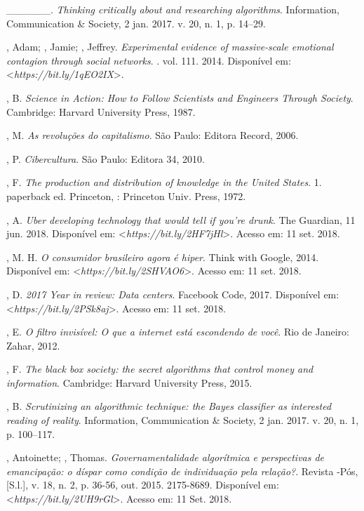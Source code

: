 \begin{Parskip}
\_\_\_\_\_\_. \emph{Thinking critically about and researching
algorithms}. Information, Communication \& Society, 2 jan. 2017. v. 20,
n. 1, p. 14--29.

, Adam; , Jamie; , Jeffrey. \emph{Experimental evidence of massive-scale emotional contagion through social networks}. . vol.
111. 2014. Disponível em: \textless{}\emph{https://bit.ly/1qEO2IX}\textgreater{}.

, B. \emph{Science in Action: How to Follow Scientists and
Engineers Through Society}. Cambridge: Harvard University Press, 1987.

, M. \emph{As revoluções do capitalismo}. São Paulo: Editora
Record, 2006.

, P. \emph{Cibercultura}. São Paulo: Editora 34, 2010.

, F. \emph{The production and distribution of knowledge in the
United States}. 1. paperback ed. Princeton, : Princeton Univ.
Press, 1972.

, A. \emph{Uber developing technology that would tell if you're
drunk}. The Guardian, 11 jun. 2018. Disponível em: \textless{}\emph{https://bit.ly/2HF7jHl}\textgreater{}.
Acesso em: 11 set. 2018.

, M. H. \emph{O consumidor brasileiro agora é hiper}. Think
with Google, 2014. Disponível em: \textless{}\emph{https://bit.ly/2SHVAO6}\textgreater{}.
Acesso em: 11 set. 2018.

, D. \emph{2017 Year in review: Data centers}. Facebook Code,
2017. Disponível em: \textless{}\emph{https://bit.ly/2PSk8aj}\textgreater{}. Acesso em: 11 set. 2018.

, E. \emph{O filtro invisível: O que a internet está escondendo
de você}. Rio de Janeiro: Zahar, 2012.

, F. \emph{The black box society: the secret algorithms that
control money and information}. Cambridge: Harvard University Press,
2015.

, B. \emph{Scrutinizing an algorithmic technique: the Bayes
classifier as interested reading of reality}. Information, Communication
\& Society, 2 jan. 2017. v. 20, n. 1, p. 100--117.

, Antoinette; , Thomas. \emph{Governamentalidade
algorítmica e perspectivas de emancipação: o díspar como condição de
individuação pela relação?}. Revista -Pós, [S.l.], v. 18, n. 2, p.
36-56, out. 2015.  2175-8689. Disponível em:
\textless{}\emph{https://bit.ly/2UH9rGl}\textgreater{}. Acesso em: 11 Set. 2018.


\end{Parskip}
